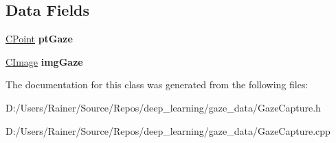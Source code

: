 \subsection*{Data Fields}
\begin{DoxyCompactItemize}
\item 
\mbox{\label{class_c_gaze_capture_ad466c17d2b1ca4f2ef5f61fbca1faa0a}} 
\hyperlink{class_c_point}{C\+Point} {\bfseries pt\+Gaze}
\item 
\mbox{\label{class_c_gaze_capture_a3f3eba32fb105466c73e8c1e5f5e6887}} 
\hyperlink{class_c_image}{C\+Image} {\bfseries img\+Gaze}
\end{DoxyCompactItemize}


The documentation for this class was generated from the following files\+:\begin{DoxyCompactItemize}
\item 
D\+:/\+Users/\+Rainer/\+Source/\+Repos/deep\+\_\+learning/gaze\+\_\+data/Gaze\+Capture.\+h\item 
D\+:/\+Users/\+Rainer/\+Source/\+Repos/deep\+\_\+learning/gaze\+\_\+data/Gaze\+Capture.\+cpp\end{DoxyCompactItemize}
